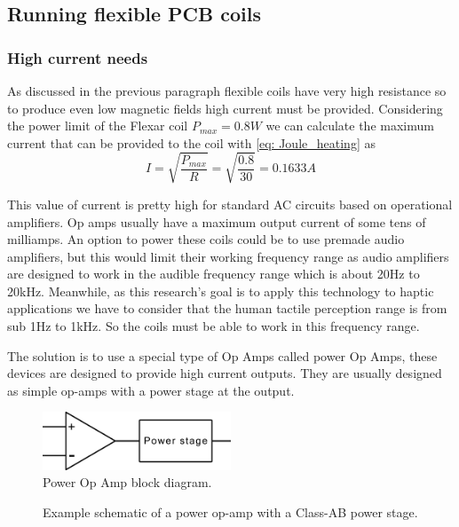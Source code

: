 \subsection{Running flexible PCB coils}

\subsubsection{High current needs}
As discussed in the previous paragraph flexible coils have very high resistance so to produce even low magnetic fields high current must be provided.
Considering the power limit of the Flexar coil $P_{max} = 0.8W$ we can calculate the maximum current that can be provided to the coil with \eqref{eq: Joule_heating} as
\begin{equation}
    I = \sqrt{\frac{P_{max}}{R}} = \sqrt{\frac{0.8}{30}} = 0.1633A
\end{equation}

This value of current is pretty high for standard AC circuits based on operational amplifiers.
Op amps usually have a maximum output current of some tens of milliamps.
An option to power these coils could be to use premade audio amplifiers, but this would limit their working frequency range as audio amplifiers are designed to work in the audible frequency range which is about 20Hz to 20kHz.
Meanwhile, as this research's goal is to apply this technology to haptic applications we have to consider that the human tactile perception range is from sub 1Hz to 1kHz. %
So the coils must be able to work in this frequency range.

The solution is to use a special type of Op Amps called power Op Amps, these devices are designed to provide high current outputs.
They are usually designed as simple op-amps with a power stage at the output.
\begin{figure}
    \centering
    \includegraphics[width=0.5\textwidth]{Chapters/Chapter2/Flexible_PCB_Coils/Figures/power_op-amp_block_diagram.png}
    \caption{Power Op Amp block diagram.}
    \label{fig: Power_Op_Amp}
\end{figure}

\begin{figure}
    \vfill
    
    \caption[Power op-amp schematic]{Example schematic of a power op-amp with a Class-AB power stage.}
    \label{fig: Power_op-amp_example}
\end{figure}

